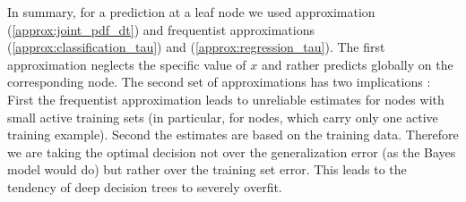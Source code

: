 \documentclass[12pt,a4paper]{article}
\begin{document}
In summary, for a prediction at a leaf node we used approximation (\ref{approx:joint_pdf_dt}) and frequentist approximations (\ref{approx:classification_tau}) and (\ref{approx:regression_tau}). 
The first approximation neglects the specific value of $x$ and rather predicts globally on  the corresponding node. The second set of approximations has two implications \cite[Chapter~3.4]{understanding_random_forests}: 
First the frequentist approximation leads to unreliable estimates for nodes with small active training sets (in  particular, for nodes, which carry only one active training example). Second the estimates are based on the training data. Therefore we are taking the optimal decision not over the generalization error (as the Bayes model would do) but rather over the training set error.  This leads to the tendency of deep decision trees to severely overfit.
\end{document}
